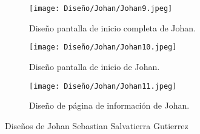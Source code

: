 \begin{figure}[h!]
  \ContinuedFloat
  \begin{subfigure}{\textwidth}
    \centering
    \texttt{[image: Diseño/Johan/Johan9.jpeg]}
    \caption{Diseño pantalla de inicio completa de Johan.}
    \label{Johan9}
  \end{subfigure}

  \begin{subfigure}{\textwidth}
    \centering
    \texttt{[image: Diseño/Johan/Johan10.jpeg]}
    \caption{Diseño pantalla de inicio de Johan.}
    \label{Johan10}
  \end{subfigure}

  \begin{subfigure}{\textwidth}
    \centering
    \texttt{[image: Diseño/Johan/Johan11.jpeg]}
	\caption{Diseño de página de información de Johan.}
	\label{Johan11}
  \end{subfigure}

  \caption{Diseños de Johan Sebastian Salvatierra Gutierrez}
  \label{fig:disenyoJohan}
\end{figure}